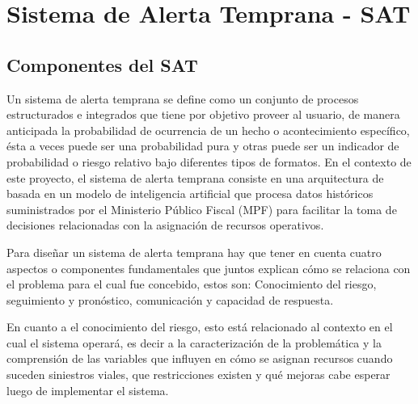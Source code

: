 
\section{Sistema de Alerta Temprana - SAT}\label{sistema-de-alerta-temprana---sat}

\subsection{Componentes del SAT}\label{componentes-del-sat}

Un sistema de alerta temprana se define como un conjunto de procesos estructurados e integrados que tiene por objetivo proveer al usuario, de manera anticipada la probabilidad de ocurrencia de un hecho o acontecimiento específico, ésta a veces puede ser una probabilidad pura y otras puede ser un indicador de probabilidad o riesgo relativo bajo diferentes tipos de formatos. En el contexto de este proyecto, el sistema de alerta temprana consiste en una arquitectura de  basada en un modelo de inteligencia artificial que procesa datos históricos suministrados por el Ministerio Público Fiscal (MPF) para facilitar la toma de decisiones relacionadas con la asignación de recursos operativos.

Para diseñar un sistema de alerta temprana hay que tener en cuenta cuatro aspectos o componentes fundamentales que juntos explican cómo se relaciona con el problema para el cual fue concebido, estos son: Conocimiento del riesgo, seguimiento y pronóstico, comunicación y capacidad de respuesta.

En cuanto a el conocimiento del riesgo, esto está relacionado al contexto en el cual el sistema operará, es decir a la caracterización de la problemática y la comprensión de las variables que influyen en cómo se asignan recursos cuando suceden siniestros viales, que restricciones existen y qué mejoras cabe esperar luego de implementar el sistema.

